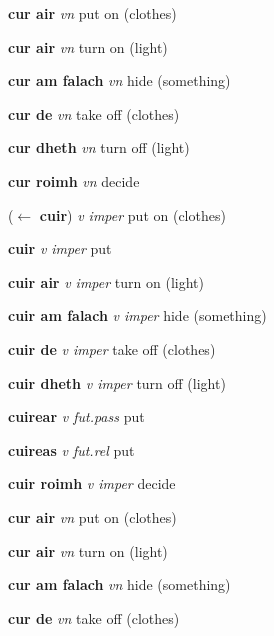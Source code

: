 \documentclass[a4paper,12pt, oneside]{article}
\newcommand \hw[1]{{\color{mygreen}{\large{\headword #1}}}}
\newcommand \lw[1]{{\textbf{\lemword #1}}}
\newcommand \sw[1]{{\textbf{{\subword #1}}}}
\begin{document}
\hspace{10mm} \sw{cur air} \textit{vn    } put on (clothes) 

\hspace{10mm} \sw{cur air} \textit{vn    } turn on  (light) 

\hspace{10mm} \sw{cur am falach} \textit{vn    } hide (something) 

\hspace{10mm} \sw{cur de} \textit{vn    } take off (clothes) 

\hspace{10mm} \sw{cur dheth} \textit{vn    } turn off (light) 

\hspace{10mm} \sw{cur roimh} \textit{vn    } decide  

\hw{cuir air} ($\leftarrow$ \lw{cuir}) \textit{v    imper} put on (clothes) 

\hspace{10mm} \sw{cuir} \textit{v    imper} put  

\hspace{10mm} \sw{cuir air} \textit{v    imper} turn on (light) 

\hspace{10mm} \sw{cuir am falach} \textit{v    imper} hide (something) 

\hspace{10mm} \sw{cuir de} \textit{v    imper} take off (clothes) 

\hspace{10mm} \sw{cuir dheth} \textit{v    imper} turn off (light) 

\hspace{10mm} \sw{cuirear} \textit{v    fut.pass} put  

\hspace{10mm} \sw{cuireas} \textit{v    fut.rel} put  

\hspace{10mm} \sw{cuir roimh} \textit{v    imper} decide  

\hspace{10mm} \sw{cur air} \textit{vn    } put on (clothes) 

\hspace{10mm} \sw{cur air} \textit{vn    } turn on  (light) 

\hspace{10mm} \sw{cur am falach} \textit{vn    } hide (something) 

\hspace{10mm} \sw{cur de} \textit{vn    } take off (clothes) 
\end{document}
